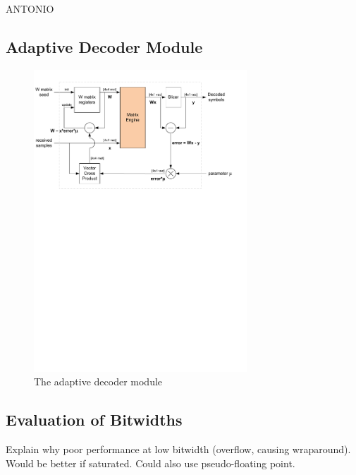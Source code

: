 \documentclass[journal]{IEEEtran}
\begin{document}
ANTONIO

\subsection{Adaptive Decoder Module}

\begin{figure}[!h]
\centering
\includegraphics*[width=8cm, viewport = 0 510 560 810]{images/adaptive_decoder.pdf}
\caption{The adaptive decoder module}
\label{adaptive_decoder}
\end{figure}

\subsection{Evaluation of Bitwidths}

Explain why poor performance at low bitwidth (overflow, causing wraparound). Would be better if saturated. Could also use pseudo-floating point.
\end{document}
